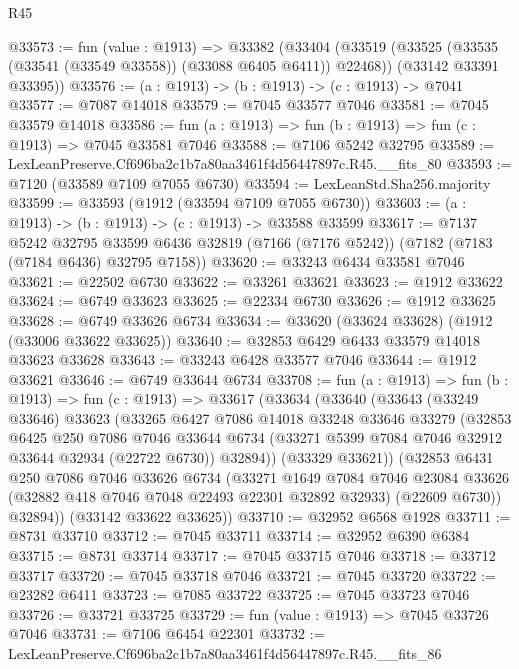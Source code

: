 \begin{lexlean}{R45}
\begin{coremodule}
{@33573 := fun (value : @1913) =>
  @33382
    (@33404
      (@33519 (@33525 (@33535 (@33541 (@33549 @33558)) (@33088 @6405 @6411)) @22468))
      (@33142 @33391 @33395))
@33576 := (a : @1913) -> (b : @1913) -> (c : @1913) -> @7041
@33577 := @7087 @14018
@33579 := @7045 @33577 @7046
@33581 := @7045 @33579 @14018
@33586 := fun (a : @1913) => fun (b : @1913) => fun (c : @1913) => @7045 @33581 @7046
@33588 := @7106 @5242 @32795
@33589 := LexLeanPreserve.Cf696ba2c1b7a80aa3461f4d56447897c.R45.__fits_80
@33593 := @7120 (@33589 @7109 @7055 @6730)
@33594 := LexLeanStd.Sha256.majority
@33599 := @33593 (@1912 (@33594 @7109 @7055 @6730))
@33603 := (a : @1913) -> (b : @1913) -> (c : @1913) -> @33588 @33599
@33617 := @7137
    @5242
    @32795
    @33599
    @6436
    @32819
    (@7166 (@7176 @5242))
    (@7182 (@7183 (@7184 @6436) @32795 @7158))
@33620 := @33243 @6434 @33581 @7046
@33621 := @22502 @6730
@33622 := @33261 @33621
@33623 := @1912 @33622
@33624 := @6749 @33623
@33625 := @22334 @6730
@33626 := @1912 @33625
@33628 := @6749 @33626 @6734
@33634 := @33620 (@33624 @33628) (@1912 (@33006 @33622 @33625))
@33640 := @32853 @6429 @6433 @33579 @14018 @33623 @33628
@33643 := @33243 @6428 @33577 @7046
@33644 := @1912 @33621
@33646 := @6749 @33644 @6734
@33708 := fun (a : @1913) =>
  fun (b : @1913) =>
  fun (c : @1913) =>
  @33617
    (@33634
      (@33640
        (@33643
          (@33249 @33646)
          @33623
          (@33265
            @6427
            @7086
            @14018
            @33248
            @33646
            @33279
            (@32853
              @6425
              @250
              @7086
              @7046
              @33644
              @6734
              (@33271 @5399 @7084 @7046 @32912 @33644 @32934 (@22722 @6730))
              @32894))
          (@33329 @33621))
        (@32853
          @6431
          @250
          @7086
          @7046
          @33626
          @6734
          (@33271
            @1649
            @7084
            @7046
            @23084
            @33626
            (@32882 @418 @7046 @7048 @22493 @22301 @32892 @32933)
            (@22609 @6730))
          @32894))
      (@33142 @33622 @33625))
@33710 := @32952 @6568 @1928
@33711 := @8731 @33710
@33712 := @7045 @33711
@33714 := @32952 @6390 @6384
@33715 := @8731 @33714
@33717 := @7045 @33715 @7046
@33718 := @33712 @33717
@33720 := @7045 @33718 @7046
@33721 := @7045 @33720
@33722 := @23282 @6411
@33723 := @7085 @33722
@33725 := @7045 @33723 @7046
@33726 := @33721 @33725
@33729 := fun (value : @1913) => @7045 @33726 @7046
@33731 := @7106 @6454 @22301
@33732 := LexLeanPreserve.Cf696ba2c1b7a80aa3461f4d56447897c.R45.__fits_86
}
\end{coremodule}
\end{lexlean}
